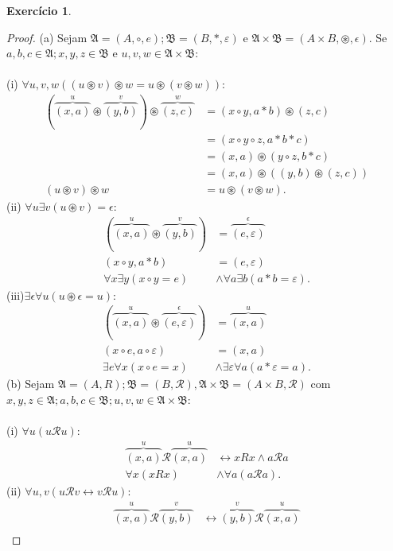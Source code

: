 \documentclass[11pt]{article}
\theoremstyle{definition}
\newtheorem{exer}{Exercício}
\newcommand{\sse}{\leftrightarrow}
\newcommand{\mc}[1]{\mathcal{#1}}
\newcommand{\mf}[1]{\mathfrak{#1}}
\begin{document}
\begin{exer}
\begin{proof}
(a) Sejam $\mf{A}=(A,\circ,e);\mf{B}=(B,*,\varepsilon)$ e $\mf{A}\times\mf{B}=(A\times B,\circledast,\epsilon)$. Se $a,b,c\in\mf{A};x,y,z\in\mf{B}$ e $u,v,w\in\mf{A}\times\mf{B}$:\\\\
(i) $\forall u,v,w((u\circledast v)\circledast w = u\circledast(v\circledast w))$:
\begin{align*}
    (\overbrace{(x,a)}^u\circledast \overbrace{(y,b)}^v)\circledast \overbrace{(z,c)}^w & = (x\circ y,a*b)\circledast (z,c)\\
    & = (x\circ y\circ z,a*b*c)\\
    & = (x,a)\circledast(y\circ z,b*c)\\
    & = (x,a)\circledast((y,b)\circledast(z,c))\\
    (u\circledast v)\circledast w & = u\circledast(v\circledast w).
\end{align*}
(ii) $\forall u\exists v(u\circledast v)=\epsilon$:
\begin{align*}
    (\overbrace{(x,a)}^u\circledast\overbrace{(y,b)}^v) & = \overbrace{(e,\varepsilon)}^\epsilon\\
    (x\circ y,a*b) & =(e,\varepsilon)\\
    \forall x\exists y(x\circ y=e)& \wedge \forall a\exists b(a*b=\varepsilon).
\end{align*}
(iii)$\exists\epsilon\forall u(u\circledast\epsilon=u)$:
\begin{align*}
    (\overbrace{(x,a)}^u\circledast\overbrace{(e,\varepsilon)}^\epsilon) & =\overbrace{(x,a)}^u\\
    (x\circ e,a\circ\varepsilon) & = (x,a)\\
    \exists e\forall x(x\circ e=x) & \wedge \exists\varepsilon\forall a(a*\varepsilon=a).
\end{align*}
(b) Sejam $\mf{A}=(A,R);\mf{B}=(B,\mc{R}),\mf{A}\times\mf{B}=(A\times B,\mathscr{R})$ com $x,y,z\in\mf{A};a,b,c\in\mf{B};u,v,w\in\mf{A}\times\mf{B}$:\\\\
(i) $\forall u(u\mathscr{R}u)$:
\begin{align*}
    \overbrace{(x,a)}^u\mathscr{R}\overbrace{(x,a)}^u & \sse xRx\wedge a\mc{R}a\\
    \forall x(xRx) & \wedge \forall a(a\mc{R}a).
\end{align*}
(ii) $\forall u,v(u\mathscr{R}v\sse v\mathscr{R}u)$:
\begin{align*}
    \overbrace{(x,a)}^u\mathscr{R}\overbrace{(y,b)}^v & \sse \overbrace{(y,b)}^v\mathscr{R}\overbrace{(x,a)}^u\\

\end{align*}
\end{proof}
\end{exer}
\end{document}
